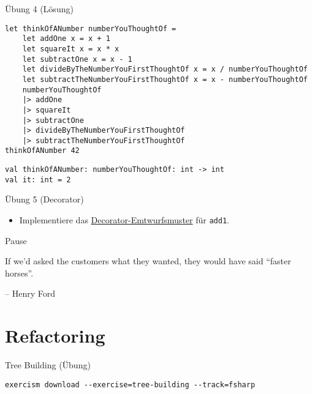 \documentclass[t]{beamer}
\begin{document}
\begin{frame}[label={sec:org5af5f2d},fragile]{Übung 4 (Lösung)}
 \begin{verbatim}
let thinkOfANumber numberYouThoughtOf =
    let addOne x = x + 1
    let squareIt x = x * x
    let subtractOne x = x - 1
    let divideByTheNumberYouFirstThoughtOf x = x / numberYouThoughtOf
    let subtractTheNumberYouFirstThoughtOf x = x - numberYouThoughtOf
    numberYouThoughtOf
    |> addOne
    |> squareIt
    |> subtractOne
    |> divideByTheNumberYouFirstThoughtOf
    |> subtractTheNumberYouFirstThoughtOf
thinkOfANumber 42
\end{verbatim}

\begin{verbatim}
val thinkOfANumber: numberYouThoughtOf: int -> int
val it: int = 2
\end{verbatim}
\end{frame}

\begin{frame}[label={sec:org5aefc41},fragile]{Übung 5 (Decorator)}
 \begin{itemize}
\item Implementiere das \href{https://de.wikipedia.org/wiki/Decorator}{Decorator-Emtwurfsmuster} für \texttt{add1}.
\end{itemize}
\end{frame}

\begin{frame}[label={sec:orgf8a9d2e}]{Pause}
\begin{block}{}
If we’d asked the customers what they wanted, they would have said “faster horses”.

\null\hfill -- Henry Ford
\end{block}
\end{frame}

\section{Refactoring }
\label{sec:org2e09a26}
\begin{frame}[label={sec:org917ad1c},fragile]{Tree Building (Übung)}
 \begin{verbatim}
exercism download --exercise=tree-building --track=fsharp
\end{verbatim}
\end{frame}
\end{document}

